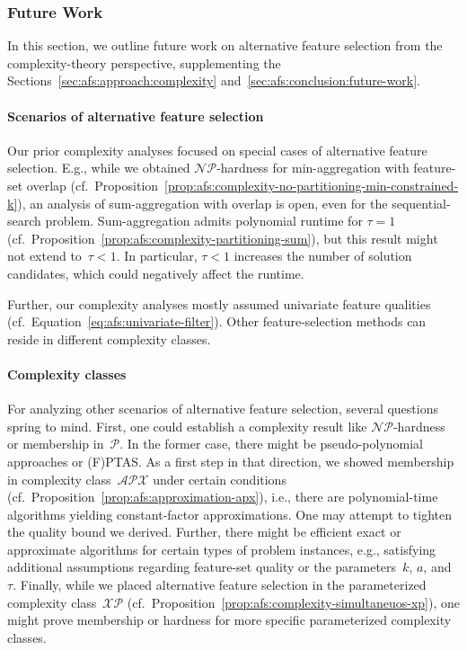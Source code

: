 \documentclass{article}
\theoremstyle{definition}
\begin{document}
\subsubsection{Future Work}
\label{sec:afs:appendix:complexity:future-work}

In this section, we outline future work on alternative feature selection from the complexity-theory perspective, supplementing the Sections~\ref{sec:afs:approach:complexity} and~\ref{sec:afs:conclusion:future-work}.

\paragraph{Scenarios of alternative feature selection}

Our prior complexity analyses focused on special cases of alternative feature selection.
E.g., while we obtained $\mathcal{NP}$-hardness for min-aggregation with feature-set overlap (cf.~Proposition~\ref{prop:afs:complexity-no-partitioning-min-constrained-k}), an analysis of sum-aggregation with overlap is open, even for the sequential-search problem.
Sum-aggregation admits polynomial runtime for $\tau=1$ (cf.~Proposition~\ref{prop:afs:complexity-partitioning-sum}), but this result might not extend to~$\tau < 1$.
In particular, $\tau < 1$ increases the number of solution candidates, which could negatively affect the runtime.

Further, our complexity analyses mostly assumed univariate feature qualities (cf.~Equation~\ref{eq:afs:univariate-filter}).
Other feature-selection methods can reside in different complexity classes.

\paragraph{Complexity classes}

For analyzing other scenarios of alternative feature selection, several questions spring to mind.
First, one could establish a complexity result like $\mathcal{NP}$-hardness or membership in~$\mathcal{P}$.
In the former case, there might be pseudo-polynomial approaches or (F)PTAS.
As a first step in that direction, we showed membership in complexity class~$\mathcal{APX}$ under certain conditions (cf.~Proposition~\ref{prop:afs:approximation-apx}), i.e., there are polynomial-time algorithms yielding constant-factor approximations.
One may attempt to tighten the quality bound we derived.
Further, there might be efficient exact or approximate algorithms for certain types of problem instances, e.g., satisfying additional assumptions regarding feature-set quality or the parameters~$k$, $a$, and $\tau$.
Finally, while we placed alternative feature selection in the parameterized complexity class~$\mathcal{XP}$ (cf.~Proposition~\ref{prop:afs:complexity-simultaneuos-xp}), one might prove membership or hardness for more specific parameterized complexity classes.
\end{document}
